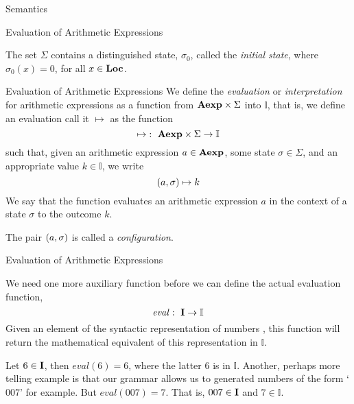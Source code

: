 \documentclass{beamer}
\begin{document}
\begin{frame}{Semantics}
\begin{frame}{\large Evaluation of Arithmetic Expressions}
\vspace{.1in}

The set $\Sigma$ contains a distinguished state, $\sigma_0$, called the {\em initial state}, where $\sigma_0(x) = 0$, for all $x \in \mbox{\bf Loc}$.

\end{frame}


\begin{frame}{\large Evaluation of Arithmetic Expressions}
We define the {\em evaluation}  or {\em interpretation} for arithmetic expressions as a function
from $\mbox{\bf Aexp} \times \Sigma$ into $\mathbb{I}$, that is, we define an evaluation
call it $\mapsto$ as the function
\[
\mapsto \,\colon\; \mbox{\bf Aexp} \times \Sigma \rightarrow \mathbb{I}
\]
such that, given an arithmetic expression $a \in \mbox{\bf Aexp}$, some state $\sigma \in \Sigma$, and
an appropriate value $k \in \mathbb{I}$, we write
\[
({a}, {\sigma} ) \mapsto k
\]
We say that the function evaluates an arithmetic expression  $a$ in the context of a state $\sigma$ to
the outcome $k$.

\vspace{.1in}

The pair $({a}, {\sigma} )$ is called a {\em configuration}.

\end{frame}


\begin{frame}{\large Evaluation of Arithmetic Expressions}

\small
We need one more auxiliary function before we can define the actual evaluation function,
\[
\mathit{eval}\,\colon\; \mbox{\bf I} \rightarrow \mathbb{I}
\]
Given an element of the syntactic representation of numbers , this
function will return the mathematical equivalent of this representation in $\mathbb{I}$.

\vspace{.1in}

Let $6 \in \mbox{\bf I}$, then $\mathit{eval}(6) = 6$, where the latter $6$ is in $\mathbb{I}$.
Another, perhaps more telling example is that our grammar allows us to generated numbers of
the form `$007$' for example.  But $\mathit{eval}(007) = 7$.  That is, $007\in\mbox{\bf I}$ and
$7\in\mathbb{I}$.

\vspace{.1in}


\end{frame}
\end{frame}
\end{document}

